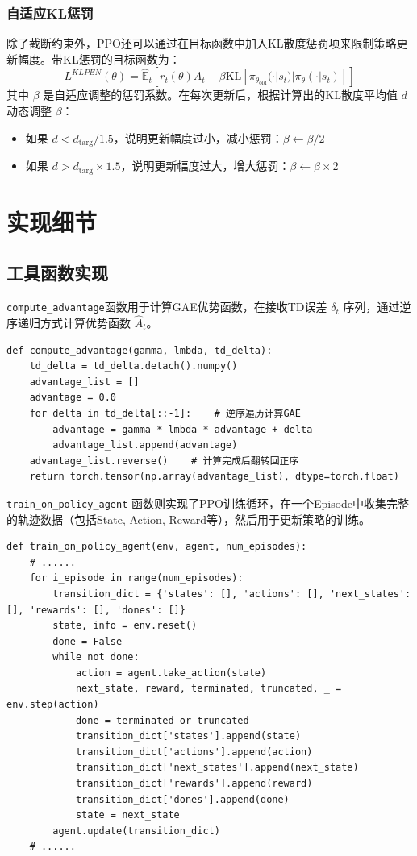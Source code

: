 \documentclass[11pt]{article}
\begin{document}
    \subsubsection{自适应KL惩罚}
    除了截断约束外，PPO还可以通过在目标函数中加入KL散度惩罚项来限制策略更新幅度。带KL惩罚的目标函数为：
    \begin{equation}
        L^{KLPEN}(\theta) = \hat{\mathbb{E}}_t \left[ r_t(\theta)\hat{A}_t - \beta \text{KL}[\pi_{\theta_{\text{old}}}(\cdot|s_t) | \pi_\theta(\cdot|s_t)] \right]
    \end{equation}
    其中 $\beta$ 是自适应调整的惩罚系数。在每次更新后，根据计算出的KL散度平均值 $d$ 动态调整 $\beta$：
    \begin{itemize}
        \item 如果 $d < d_{\text{targ}} / 1.5$，说明更新幅度过小，减小惩罚：$\beta \leftarrow \beta / 2$
        \item 如果 $d > d_{\text{targ}} \times 1.5$，说明更新幅度过大，增大惩罚：$\beta \leftarrow \beta \times 2$
    \end{itemize}

    \section{实现细节}
    \subsection{工具函数实现}
    \texttt{compute\_advantage}函数用于计算GAE优势函数，在接收TD误差 $\delta_t$ 序列，通过逆序递归方式计算优势函数 $\hat{A}_t$。
    \begin{lstlisting}
def compute_advantage(gamma, lmbda, td_delta):
    td_delta = td_delta.detach().numpy()
    advantage_list = []
    advantage = 0.0
    for delta in td_delta[::-1]:    # 逆序遍历计算GAE
        advantage = gamma * lmbda * advantage + delta
        advantage_list.append(advantage)
    advantage_list.reverse()    # 计算完成后翻转回正序
    return torch.tensor(np.array(advantage_list), dtype=torch.float)
    \end{lstlisting}

    \texttt{train\_on\_policy\_agent} 函数则实现了PPO训练循环，在一个Episode中收集完整的轨迹数据（包括State, Action, Reward等），然后用于更新策略的训练。

    \begin{lstlisting}
def train_on_policy_agent(env, agent, num_episodes):
    # ......
    for i_episode in range(num_episodes):
        transition_dict = {'states': [], 'actions': [], 'next_states': [], 'rewards': [], 'dones': []}
        state, info = env.reset()
        done = False
        while not done:
            action = agent.take_action(state)
            next_state, reward, terminated, truncated, _ = env.step(action)
            done = terminated or truncated
            transition_dict['states'].append(state)
            transition_dict['actions'].append(action)
            transition_dict['next_states'].append(next_state)
            transition_dict['rewards'].append(reward)
            transition_dict['dones'].append(done)
            state = next_state
        agent.update(transition_dict)
    # ......
    \end{lstlisting}
\end{document}

